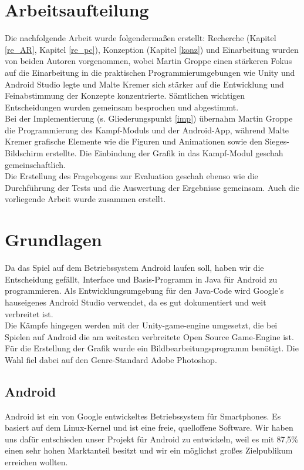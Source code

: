 \documentclass[extern,palatino]{cgBA}
\begin{document}
\section{Arbeitsaufteilung}
Die nachfolgende Arbeit wurde folgendermaßen erstellt: Recherche (Kapitel \ref{re_AR}, Kapitel \ref{re_pc}), Konzeption (Kapitel \ref{konz}) und Einarbeitung wurden von beiden Autoren vorgenommen, wobei Martin Groppe einen stärkeren Fokus auf die Einarbeitung in die praktischen Programmierumgebungen wie Unity und Android Studio legte und Malte Kremer sich stärker auf die Entwicklung und Feinabstimmung der Konzepte konzentrierte. Sämtlichen wichtigen Entscheidungen wurden gemeinsam besprochen und abgestimmt.\\
Bei der Implementierung (s. Gliederungspunkt \ref{imp}) übernahm Martin Groppe die Programmierung des Kampf-Moduls und der Android-App, während Malte Kremer grafische Elemente wie die Figuren und Animationen sowie den Sieges-Bildschirm erstellte. Die Einbindung der Grafik in das Kampf-Modul geschah gemeinschaftlich.
\\Die Erstellung des Fragebogens zur Evaluation geschah ebenso wie die Durchführung der Tests und die Auswertung der Ergebnisse gemeinsam. Auch die vorliegende Arbeit wurde zusammen erstellt.
\newpage
\section{Grundlagen}
Da das Spiel auf dem Betriebssystem Android laufen soll, haben wir die Entscheidung gefällt, Interface und Basis-Programm in Java für Android zu programmieren. Als Entwicklungsumgebung für den Java-Code wird Google's hauseigenes Android Studio verwendet, da es gut dokumentiert und weit verbreitet ist.
\\Die Kämpfe hingegen werden mit der Unity-game-engine umgesetzt, die bei Spielen auf Android die am weitesten verbreitete Open Source Game-Engine\cite{unpub} ist. Für die Erstellung der Grafik wurde ein Bildbearbeitungsprogramm benötigt. Die Wahl fiel dabei auf den Genre-Standard Adobe Photoshop.
\subsection{Android}
Android ist ein von Google entwickeltes Betriebssystem für Smartphones. Es basiert auf dem Linux-Kernel und ist eine freie, quelloffene Software. Wir haben uns dafür entschieden unser Projekt für Android zu entwickeln, weil es mit 87,5\%\cite{and0} einen sehr hohen Marktanteil besitzt und wir ein möglichst großes Zielpublikum erreichen wollten. 
\end{document}
